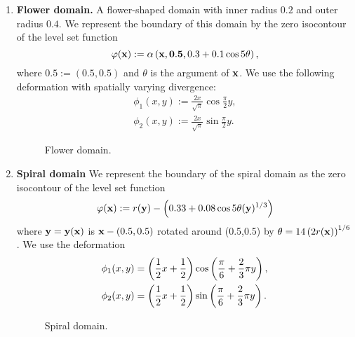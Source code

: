 \begin{enumerate}
\item \textbf{Flower domain.} A flower-shaped domain with inner radius $0.2$ and outer radius $0.4$. We represent the boundary of this domain by the zero isocontour of the level set function
\begin{equation*}
\varphi(\mathbf{x}) := \alpha \left( \mathbf{x}, \mathbf{0.5}, 0.3 + 0.1 \cos 5\theta \right),
\end{equation*}
where $\mathbf{0.5} := (0.5,0.5)$ and $\theta$ is the argument of $\mathbf{x}$. We use the following deformation with spatially varying divergence:
\begin{align*}
\phi_1(x,y) := \frac{2x}{\sqrt{\pi}} \cos \frac{\pi}{2} y, \\
\phi_2(x,y) := \frac{2x}{\sqrt{\pi}} \sin \frac{\pi}{2} y.
\end{align*}

\setlength{\figurewidth}{0.50\textwidth}
\begin{figure}[htbp]
\centering
{}
\caption{Flower domain.}
\end{figure}

\item \textbf{Spiral domain} We represent the boundary of the spiral domain as the zero isocontour of the level set function
\begin{equation*}
\varphi(\mathbf{x}) := r(\mathbf{y}) - \left( 0.33 + 0.08 \cos 5\theta(\mathbf{y})^{1/3} \right)
\end{equation*}
where $\mathbf{y} = \mathbf{y}(\mathbf{x})$ is $\mathbf{x} - (0.5,0.5)$ rotated around (0.5,0.5) by $\theta = 14 \left( 2r(\mathbf{x}) \right)^{1/6}$. We use the deformation
\begin{align*}
\phi_1(x,y) & = \left( \frac{1}{2} x + \frac{1}{2} \right) \cos \left( \frac{\pi}{6} + \frac{2}{3} \pi y \right), \\
\phi_2(x,y) & = \left( \frac{1}{2} x + \frac{1}{2} \right) \sin \left( \frac{\pi}{6} + \frac{2}{3} \pi y \right).
\end{align*}

\setlength{\figurewidth}{0.50\textwidth}
\begin{figure}[htbp]
\centering
{}
\caption{Spiral domain.}
\end{figure}

\end{enumerate}

